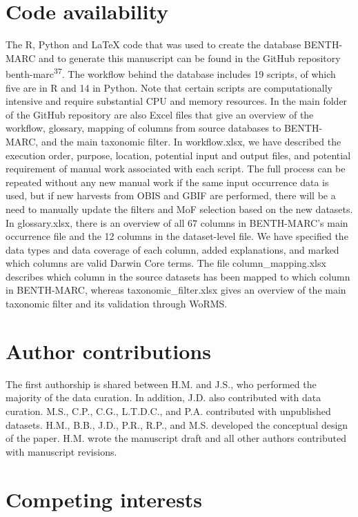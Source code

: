 \documentclass[
  letterpaper,
  DIV=11,
  numbers=noendperiod]{scrartcl}
\begin{document}
\section{Code availability}\label{code-availability}

The R, Python and LaTeX code that was used to create the database
BENTH-MARC and to generate this manuscript can be found in the GitHub
repository benth-marc\textsuperscript{37}. The workflow behind the
database includes 19 scripts, of which five are in R and 14 in Python.
Note that certain scripts are computationally intensive and require
substantial CPU and memory resources. In the main folder of the GitHub
repository are also Excel files that give an overview of the workflow,
glossary, mapping of columns from source databases to BENTH-MARC, and
the main taxonomic filter. In workflow.xlsx, we have described the
execution order, purpose, location, potential input and output files,
and potential requirement of manual work associated with each script.
The full process can be repeated without any new manual work if the same
input occurrence data is used, but if new harvests from OBIS and GBIF
are performed, there will be a need to manually update the filters and
MoF selection based on the new datasets. In glossary.xlsx, there is an
overview of all 67 columns in BENTH-MARC's main occurrence file and the
12 columns in the dataset-level file. We have specified the data types
and data coverage of each column, added explanations, and marked which
columns are valid Darwin Core terms. The file column\_mapping.xlsx
describes which column in the source datasets has been mapped to which
column in BENTH-MARC, whereas taxonomic\_filter.xlsx gives an overview
of the main taxonomic filter and its validation through WoRMS.

\section{Author contributions}\label{author-contributions}

The first authorship is shared between H.M. and J.S., who performed the
majority of the data curation. In addition, J.D. also contributed with
data curation. M.S., C.P., C.G., L.T.D.C., and P.A. contributed with
unpublished datasets. H.M., B.B., J.D., P.R., R.P., and M.S. developed
the conceptual design of the paper. H.M. wrote the manuscript draft and
all other authors contributed with manuscript revisions.

\section{Competing interests}\label{competing-interests}
\end{document}
